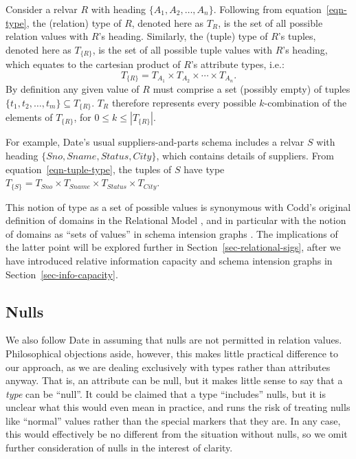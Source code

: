 \documentclass{sig-alternate-05-2015}
\newcommand{\Sno}{\ensuremath{\mathit{Sno}}}
\newcommand{\Sname}{\ensuremath{\mathit{Sname}}}
\newcommand{\Status}{\ensuremath{\mathit{Status}}}
\newcommand{\City}{\ensuremath{\mathit{City}}}
\newcommand{\T}[1]{\ensuremath{T_{#1}}}
\newcommand{\TT}[1]{\ensuremath{T_{\{#1\}}}}
\newcommand{\TSSC}{\ensuremath{\T{\Sname} \times \T{\Status} \times \T{\City}}}
\begin{document}
Consider a relvar \(R\) with heading \(\{A_{1}, A_{2}, \dotsc, A_{n}\}\). Following from equation~\ref{eqn-type}, the (relation) type of \(R\), denoted here as \(\T{R}\), is the set of all possible relation values with \(R\)'s heading. Similarly, the (tuple) type of \(R\)'s tuples, denoted here as \TT{R}, is the set of all possible tuple values with \(R\)'s heading, which equates to the cartesian product of \(R\)'s attribute types, i.e.:
\begin{equation}\label{eqn-tuple-type}
\TT{R} = \T{A_{1}} \times \T{A_{2}} \times\dotsb\times \T{A_{n}}\text{.}
\end{equation}
By definition any given value of \(R\) must comprise a set (possibly empty) of tuples \(\{t_{1}, t_{2}, \dotsc, t_{m}\} \subseteq \TT{R}\). \(\T{R}\) therefore represents every possible \(k\)-combination of the elements of \TT{R}, for \(0 \le k \le \left|\TT{R}\right|\).

For example, Date's usual suppliers-and-parts schema \cite{Date.C-2013a-View} includes a relvar \(S\!\) with heading \(\{\Sno, \Sname, \Status, \City\}\), which contains details of suppliers. From equation~\ref{eqn-tuple-type}, the tuples of \(S\!\) have type \(\TT{S} = \T{\Sno} \times \TSSC\).

This notion of type as a set of possible values is synonymous with Codd's original definition of domains in the Relational Model \cite{Codd.E-1970a-Relational,Date.C-2012a-SQL-and-Relational}, and in particular with the notion of domains as ``sets of values'' in schema intension graphs \cite{Miller.R-1994a-Schema,Miller.R-1994a-SIG}. The implications of the latter point will be explored further in Section~\ref{sec-relational-sigs}, after we have introduced relative information capacity and schema intension graphs in Section~\ref{sec-info-capacity}.




\subsection{Nulls}

\noindent We also follow Date in assuming that nulls are not permitted in relation values. Philosophical objections aside, however, this makes little practical difference to our approach, as we are dealing exclusively with types rather than attributes anyway. That is, an attribute can be null, but it makes little sense to say that a \emph{type} can be ``null''. It could be claimed that a type ``includes'' nulls, but it is unclear what this would even mean in practice, and runs the risk of treating nulls like ``normal'' values rather than the special markers that they are. In any case, this would effectively be no different from the situation without nulls, so we omit further consideration of nulls in the interest of clarity.
\end{document}
